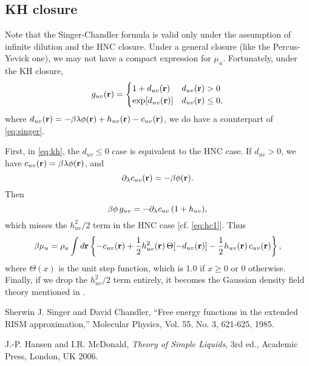 \documentclass{article}
\begin{document}
\subsection{KH closure}

Note that the Singer-Chandler formula is valid
  only under the assumption of infinite dilution
  and the HNC closure.
Under a general closure (like the Percus-Yevick one),
  we may not have a compact expression for $\mu_u$.
Fortunately, under the KH closure,
\begin{equation}
  g_{uv}(\mathbf{r}) =
  \begin{cases}
    1 + d_{uv}(\mathbf{r})
    & d_{uv}(\mathbf{r}) > 0
  \\
    \exp[ d_{uv}(\mathbf{r}) ]
    & d_{uv}(\mathbf{r}) \le 0,
  \end{cases}
  \label{eq:kh}
\end{equation}
where $d_{uv}(\mathbf{r}) = -\beta \lambda \phi(\mathbf{r}) + h_{uv}(\mathbf{r}) - c_{uv}(\mathbf{r})$,
we do have a counterpart of \eqref{eq:singer}.


First, in \eqref{eq:kh}, the $d_{uv} \le 0$ case is equivalent to the HNC case.
%
If $d_{uv} > 0$, we have $c_{uv}(\mathbf{r}) = \beta \lambda \phi(\mathbf{r})$, and
\[
  \partial_\lambda c_{uv}(\mathbf{r}) = -\beta \phi(\mathbf{r}).
\]
Then
\[
  \beta \phi \, g_{uv}
  = -\partial_\lambda c_{uv} \, (1 + h_{uv}),
\]
which misses the $h_{uv}^2/2$ term in the HNC case
  [cf. \eqref{eq:hc1}].
Thus
%
\begin{equation}
\beta \mu_u
  =
  \rho_u \int d\mathbf{r}
  \left\{
    - c_{uv}(\mathbf{r})
    + \frac{1}{2} h_{uv}^2(\mathbf{r}) \, \Theta[ -d_{uv}(\mathbf{r}) ]
    - \frac{1}{2} h_{uv}(\mathbf{r}) \, c_{uv}(\mathbf{r})
  \right\},
  \label{eq:singer-kh}
\end{equation}
%
where $\Theta(x)$ is the unit step function,
which is 1.0 if $x \ge 0$ or 0 otherwise.
%
Finally, if we drop the $h_{uv}^2/2$ term entirely,
it becomes the Gaussian density field theory mentioned in \cite{singer}.




\begin{thebibliography}{100}

  Sherwin J. Singer and David Chandler,
  ``Free energy functions in the extended RISM approximation,''
  Molecular Physics, Vol. 55, No. 3, 621-625,
  1985.

  J.-P. Hansen and I.R. McDonald,
  {\it Theory of Simple Liquids}, 3rd ed.,
  Academic Press, London, UK 2006.

\end{thebibliography}
\end{document}
